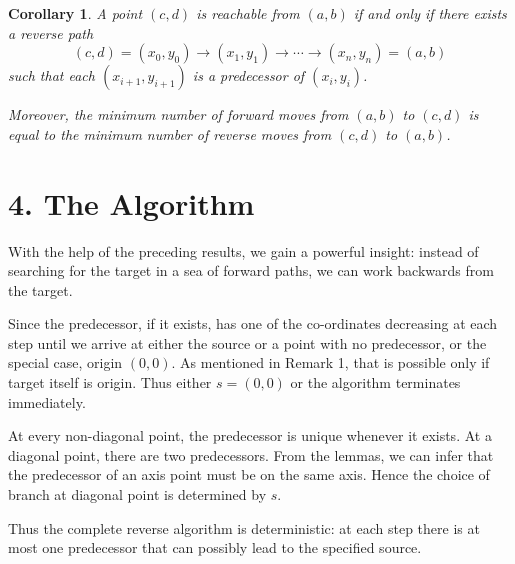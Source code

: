 \documentclass{article}
\newtheorem{corollary}{Corollary}
\begin{document}
\begin{corollary}
	A point $(c,d)$ is reachable from $(a,b)$ if and only if there exists a reverse path
	\[
		(c,d)=(x_0,y_0)\longrightarrow
		(x_1,y_1)\longrightarrow\cdots\longrightarrow
		(x_n,y_n)=(a,b)
	\]
	such that each $(x_{i+1},y_{i+1})$ is a predecessor of
	$(x_i,y_i)$.

	Moreover, the minimum number of forward moves from $(a,b)$ to $(c,d)$ is
	equal to the minimum number of reverse moves from $(c,d)$ to $(a,b)$.
\end{corollary}

\section*{4. The Algorithm}

With the help of the preceding results, we gain a powerful insight: instead of searching for the target
in a sea of forward paths, we can work backwards from the target.

Since the predecessor, if it exists, has one of the co-ordinates decreasing at each step until
we arrive at either the source or a point with no predecessor, or the special case, origin $(0, 0)$.
As mentioned in Remark 1, that is possible only if target itself is origin.
Thus either $s=(0,0)$ or the algorithm terminates immediately.

At every non-diagonal point, the predecessor is unique whenever it exists. At a diagonal point, there are two predecessors. From the lemmas, we can infer that the predecessor of an axis point must be on the same axis. Hence the choice of branch at diagonal point is determined by $s$.

Thus the complete reverse algorithm is deterministic: at each step there is at most one predecessor that can possibly lead to the specified source.
\end{document}
